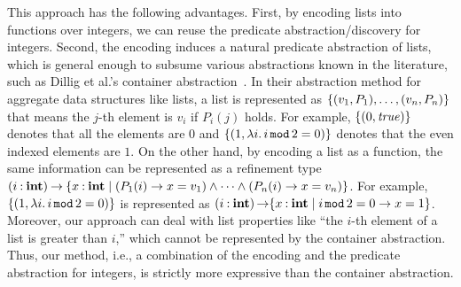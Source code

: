 
This approach has the following advantages.  First, by encoding lists
into functions over integers, we can reuse the predicate
abstraction/discovery for integers.  Second, the encoding induces a
natural predicate abstraction of lists, which is general enough to
subsume various abstractions known in the literature, such as Dillig et
al.'s container abstraction~\cite{Dillig2011}.  In their abstraction
method for aggregate data structures like lists, a list is represented
as $\{{(v_1,P_1), \dots, (v_n,P_n)}\}$ that means the $j$-th element is
$v_i$ if $P_i(j)$ holds.  For example, $\{{(0,\mathit{true})}\}$ denotes that all
the elements are $0$ and $\{{(1,\lambda{i}.\,{i \mathop{\mathtt{mod}} 2 =
0})}\}$ denotes that the even indexed elements are $1$.  On the other
hand, by encoding a list as a function, the same information can be
represented as a refinement type ${(i\mathbin{:}\mathbf{int})}\mathbin{\rightarrow}{\{{x\mathbin{:}\mathbf{int}\mid
(P_1(i) \to x=v_1) \wedge \dots \wedge (P_n(i) \to x=v_n)}\}}$.  For
example, $\{{(1,\lambda{i}.\,{i \mathop{\mathtt{mod}} 2 = 0})}\}$ is
represented as $(i\mathbin{:}\mathbf{int}) \mathop{\to} \{x\mathbin{:}\mathbf{int} \mid i
\mathop{\mathtt{mod}} 2 = 0 \to x=1\}$.  Moreover, our approach can deal
with list properties like ``the $i$-th element of a list is greater than
$i$,'' which cannot be represented by the container abstraction.  Thus,
our method, i.e., a combination of the encoding and the predicate
abstraction for integers, is strictly more expressive than the container
abstraction.

